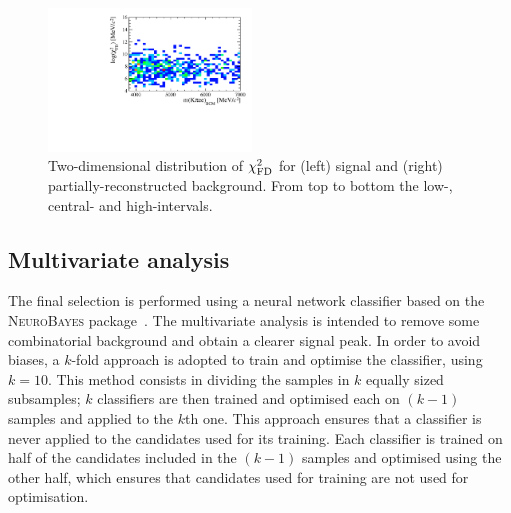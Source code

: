 \begin{figure}[t!]
\includegraphics[width=0.48\textwidth]{RKst/figs/HOP/HOP_bkg_high.pdf}
\caption{Two-dimensional distribution of $\chi^2_{\rm FD}$ \vs \mbcm for (left) \BdToKstee signal and (right) partially-reconstructed background.
From top to bottom the low-, central- and high-\qsq intervals.}
\label{fig:hop}

\end{figure}


\subsection{Multivariate analysis}
\label{sec:RKst_mva}

The final selection is performed using a neural network classifier based on the \mbox{\textsc{NeuroBayes}}
package~\cite{Feindt:2006pm,feindt-2004}. The multivariate analysis is intended to remove
some combinatorial background and obtain a clearer signal peak. In order to avoid biases, a $k$-fold
approach is adopted to train and optimise the classifier, using $k=10$. This method consists in dividing the samples
in $k$ equally sized subsamples; $k$ classifiers are then trained and optimised each on $(k-1)$ samples 
and applied to the $k$th one. This approach ensures that a classifier is never applied to the candidates used for its training.
Each classifier is trained on half of the candidates included in the $(k-1)$ samples and optimised using the other half,
which ensures that candidates used for training are not used for optimisation.

